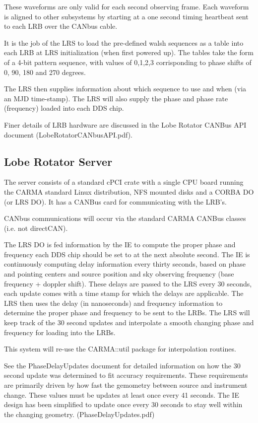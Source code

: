 \documentclass[preprint]{aastex}
\begin{document}
These waveforms are only valid for each second observing frame.
Each waveform is aligned to other subsystems by starting at a
one second timing heartbeat sent to each LRB over the CANbus cable.

It is the job of the LRS to load the pre-defined walsh sequences 
as a table into each LRB at LRS initialization (when first powered
up).  The tables take the form of a 4-bit pattern sequence, with
values of 0,1,2,3 corrisponding to phase shifts of 0, 90, 180 and 270 degrees.

The LRS then supplies information about which sequence
to use and when (via an MJD time-stamp).  The LRS will also
supply the phase and phase rate (frequency) loaded into each DDS chip.

Finer details of LRB hardware are discussed in the Lobe Rotator
CANBus API document (LobeRotatorCANbusAPI.pdf).

\subsection{Lobe Rotator Server}
The server consists of a standard cPCI crate with a single CPU board
running the CARMA standard Linux distribution, NFS mounted
disks and a CORBA DO (or LRS DO).  It has a CANBus card for
communicating with the LRB's.

CANbus communications will occur via the standard CARMA CANBus
classes (i.e. not directCAN).

The LRS DO is fed information by the IE to compute the proper phase and frequency each DDS chip
should be set to at the next absolute second.  The IE is continuously 
computing delay information every thirty seconds, based on phase and pointing centers
and source position and sky observing frequency (base frequency + doppler shift).  These
delays are passed to the LRS every 30 seconds, each update comes with a time stamp
for which the delays are applicable.  The LRS then uses the
delay (in nanoseconds) and frequency information to determine the proper
phase and frequency to be sent to the LRBs.  The LRS will keep track of the
30 second updates and interpolate a smooth changing phase and frequency 
for loading into the LRBs.

This system will re-use the CARMA::util package for interpolation routines.

See the PhaseDelayUpdates document for detailed information on how the 30 second update
was determined to fit accuracy requirements.  These requirements are primarily
driven by how fast the gemometry between source and instrument change.  These values
must be updates at least once every 41 seconds.  The IE design has been simplified
to update once every 30 seconds to stay well within the changing geometry.
(PhaseDelayUpdates.pdf)
\end{document}

